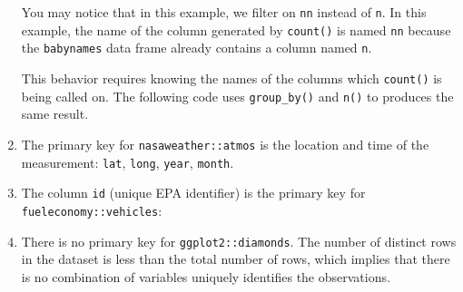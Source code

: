 \documentclass[]{book}
\newenvironment{Shaded}{\begin{snugshade}}{\end{snugshade}}
\newcommand{\CommentTok}[1]{\textcolor[rgb]{0.56,0.35,0.01}{\textit{#1}}}
\newcommand{\DecValTok}[1]{\textcolor[rgb]{0.00,0.00,0.81}{#1}}
\newcommand{\KeywordTok}[1]{\textcolor[rgb]{0.13,0.29,0.53}{\textbf{#1}}}
\newcommand{\NormalTok}[1]{#1}
\newcommand{\OperatorTok}[1]{\textcolor[rgb]{0.81,0.36,0.00}{\textbf{#1}}}
\newcommand{\StringTok}[1]{\textcolor[rgb]{0.31,0.60,0.02}{#1}}
\theoremstyle{plain}
\theoremstyle{remark}
\begin{document}
\begin{enumerate}
  You may notice that in this example, we filter on \texttt{nn} instead
  of \texttt{n}. In this example, the name of the column generated by
  \texttt{count()} is named \texttt{nn} because the \texttt{babynames}
  data frame already contains a column named \texttt{n}.

  This behavior requires knowing the names of the columns which
  \texttt{count()} is being called on. The following code uses
  \texttt{group\_by()} and \texttt{n()} to produces the same result.

\begin{Shaded}
\end{Shaded}
\item
  The primary key for \texttt{nasaweather::atmos} is the location and
  time of the measurement: \texttt{lat}, \texttt{long}, \texttt{year},
  \texttt{month}.

\begin{Shaded}
\end{Shaded}
\item
  The column \texttt{id} (unique EPA identifier) is the primary key for
  \texttt{fueleconomy::vehicles}:

\begin{Shaded}
\end{Shaded}
\item
  There is no primary key for \texttt{ggplot2::diamonds}. The number of
  distinct rows in the dataset is less than the total number of rows,
  which implies that there is no combination of variables uniquely
  identifies the observations.


\end{enumerate}
\end{document}
